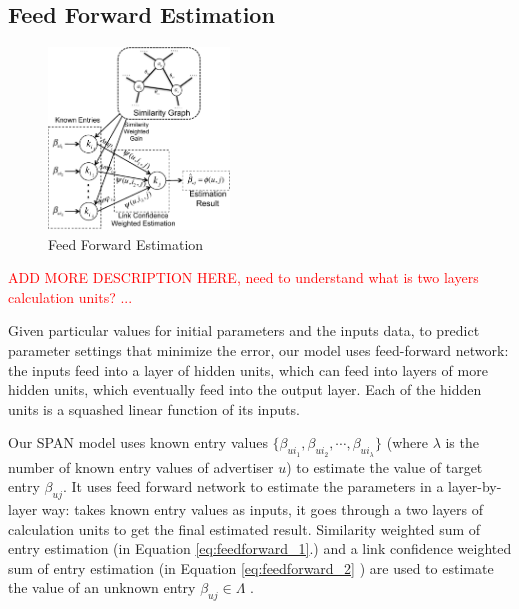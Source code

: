 
\subsection{Feed Forward Estimation}
\label{sec:ffe}

\begin{figure}[!ht]
  \centering
  \includegraphics[width=0.43\textwidth]{figures/trainer_feedforward.pdf}
  \caption{Feed Forward Estimation}
  \label{fig:trainer-feedforward}
\end{figure}

\textcolor{red}{ADD MORE DESCRIPTION HERE, need to understand what is
  two layers calculation units? ...}

Given particular values for initial parameters and the inputs data, to
predict parameter settings that minimize the error, our model uses
feed-forward network: the inputs feed into a layer of hidden units,
which can feed into layers of more hidden units, which eventually feed
into the output layer. Each of the hidden units is a squashed linear
function of its inputs.

Our SPAN model uses known entry values $\{\beta_{ui_1}, \beta_{ui_2},
\cdots, \beta_{ui_\lambda}\}$ (where $\lambda$ is the number of known
entry values of advertiser $u$) to estimate the value of target entry
$\beta_{uj}$.  It uses feed forward network to estimate the parameters
in a layer-by-layer way: takes known entry values as inputs, it goes
through a two layers of calculation units to get the final estimated
result.  Similarity weighted sum of entry estimation (in Equation
\ref{eq:feedforward_1}.) and a link confidence weighted sum of entry
estimation (in Equation \ref{eq:feedforward_2} ) are used to estimate
the value of an unknown entry $\beta_{uj} \in \Lambda$ .


